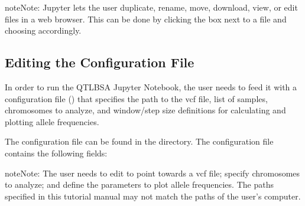\documentclass[letterpaper,10pt,english]{sphinxhowto}
\begin{document}
\begin{sphinxadmonition}{note}{Note:}
\sphinxAtStartPar
Jupyter lets the user duplicate, rename, move, download, view, or edit files in a web browser. This can be done by clicking the box next to a file and choosing accordingly.
\end{sphinxadmonition}


\subsection{Editing the Configuration File}
\label{\detokenize{index:editing-the-configuration-file}}
\sphinxAtStartPar
In order to run the QTL\sphinxhyphen{}BSA Jupyter Notebook, the user needs to feed it with a configuration file () that specifies the path to the vcf file, list of samples, chromosomes to analyze, and window/step size definitions for calculating and plotting allele frequencies.

\sphinxAtStartPar
The configuration file  can be found in the  directory. The configuration file contains the following fields:

\begin{sphinxVerbatim}[commandchars=\\\{\}]



\end{sphinxVerbatim}

\begin{sphinxadmonition}{note}{Note:}
\sphinxAtStartPar
The user needs to edit  to point towards a vcf file; specify chromosomes to analyze; and define the parameters to plot allele frequencies. The paths specified in this tutorial manual may not match the paths of the user’s computer.
\end{sphinxadmonition}
\end{document}
